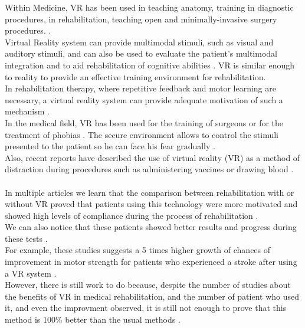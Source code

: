 \documentclass[12pt, openany, twocolumn]{article}
\begin{document}
Within Medicine, VR has been used in teaching anatomy, training in diagnostic procedures, in rehabilitation, teaching open and minimally-invasive surgery procedures.  \cite{burdeaVirtualRehabilitationBenefits2003}. \\
Virtual Reality system can provide multimodal stimuli, such as visual and auditory stimuli, and can also be used to evaluate the patient’s multimodal integration and to aid rehabilitation of cognitive abilities \cite{bioulacQuApportentOutils2018, morelAdvantagesLimitationsVirtual2015}. 
VR is similar enough to reality to provide an effective training environment for rehabilitation. \\

In rehabilitation therapy, where repetitive feedback and motor learning are necessary, a virtual reality system can provide adequate motivation of such a mechanism \cite{kimEffectsVRbasedWii2014}.\\
In the medical field, VR has been used for the training of surgeons \cite{laverVirtualRealityStroke2017} or for the treatment of phobias \cite{morelAdvantagesLimitationsVirtual2015}. The secure environment allows to control the stimuli presented to the patient so he can face his fear gradually \cite{morelAdvantagesLimitationsVirtual2015}. \\
Also, recent reports have described the use of virtual reality (VR) as a method of distraction during procedures such as administering vaccines or drawing blood \cite{araneVirtualRealityPain2017}. \\
\\

In multiple articles we learn that the comparison between rehabilitation with or without VR proved that patients using this technology were more motivated and showed high levels of compliance during the process of rehabilitation \cite{sampaioDoesVirtualRealitybased2016, chenProgressSensorimotorRehabilitative2014}. \\
We can also notice that these patients showed better results and progress during these tests \cite{corbettaRehabilitationThatIncorporates2015, saposnikEffectivenessVirtualReality2010, chenProgressSensorimotorRehabilitative2014, saposnikgustavoVirtualRealityStroke2011}. \\
For example, these studies suggests a 5 times higher growth of chances of improvement in motor strength for patients who experienced a stroke after using a VR system \cite{saposnikgustavoVirtualRealityStroke2011}.\\
However, there is still work to do because, despite the number of studies about the benefits of VR in medical rehabilitation, and the number of patient who used it, and even the improvment observed, it is still not enough to prove that this method is 100\% better than the usual methods \cite{saposnikEffectivenessVirtualReality2010, saposnikgustavoVirtualRealityStroke2011, luque-morenoDecadeProgressUsing2015}.\\




\end{document}
